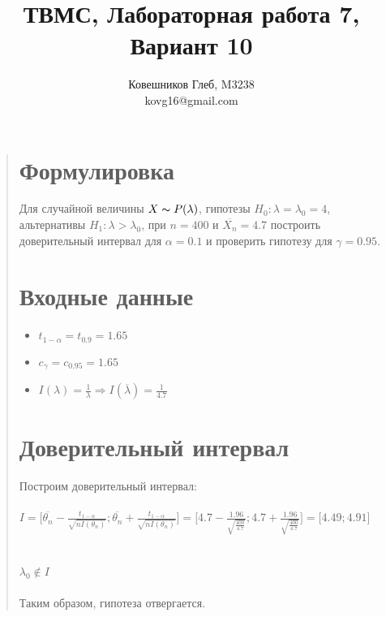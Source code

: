 \documentclass{article}
\begin{document}
\title{ТВМС, Лабораторная работа 7, Вариант 10}
\author{
	Ковешников Глеб, M3238\\
	kovg16@gmail.com
}
\maketitle

\begin{quote}
\section{Формулировка}
	\large Для случайной величины $X \thicksim P(\lambda)$, гипотезы $H_0:\lambda = \lambda_0 = 4$, альтернативы $H_1:\lambda > \lambda_0$, при $n = 400$ и $\overline{X_n} = 4.7$ построить доверительный интервал для $\alpha = 0.1$ и проверить гипотезу для $\gamma = 0.95$.
\section{Входные данные}
	\Large
        \begin{itemize}
		\item $t_{1 - \alpha} = t_{0.9} = 1.65$
		\item $c_{\gamma} = c_{0.95} = 1.65$
		\item $I(\lambda) = \frac{1}{\lambda} \Rightarrow I(\overline{\lambda}) = \frac{1}{4.7}$
        \end{itemize}
	\large
\section{Доверительный интервал}	
        Построим доверительный интервал: \\ \\
	\Large
	$I = \Biggl[\overline{\theta_n} - \frac{t_{1 - \alpha}}{\sqrt{nI(\theta_n)}} ; \overline{\theta_n} + \frac{t_{1 - \alpha}}{\sqrt{nI(\theta_n)}}\Biggr] = \Biggl[4.7 - \frac{1.96}{\sqrt{\frac{400}{4.7}}} ; 4.7 + \frac{1.96}{\sqrt{\frac{400}{4.7}}}\Biggr] = \bigl[4.49 ; 4.91\bigr]$ \\ \\ \\
	$\lambda_0 \notin I$ \\ \\
	\large
	Таким образом, гипотеза отвергается.

\end{quote}
\end{document}
